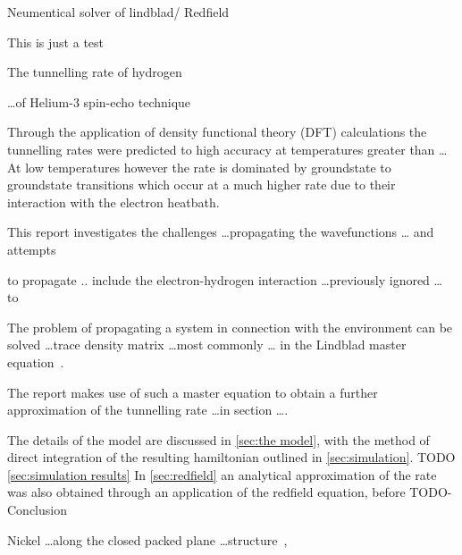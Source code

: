 
Neumentical solver of lindblad/ Redfield



This is just a test

The tunnelling rate of
hydrogen

\ldots of Helium-3 spin-echo
technique~\cite{Helium_spin_echo}

Through the application of
density functional theory (DFT)
calculations the tunnelling
rates were predicted to high
accuracy at temperatures greater
than \ldots\cite{Jianding-Zhu}
At low temperatures however
the rate is dominated
by groundstate to groundstate
transitions which occur
at a much higher rate due to
their interaction with the
electron heatbath.

This report investigates
the challenges
\ldots propagating the
wavefunctions \ldots
and attempts

to propagate
..
include the electron-hydrogen
interaction \ldots previously ignored \ldots
to

The problem of propagating
a system in connection with
the environment can
be solved \ldots trace density matrix
\ldots most commonly \ldots
in the Lindblad master
equation~\cite{Manzano_2020}.

The report makes
use of such a master equation
to obtain a further
approximation of the
tunnelling rate \ldots in section \ldots.




The details of the model
are discussed in \cref{sec:the model},
with the method of
direct integration of the
resulting hamiltonian outlined
in \cref{sec:simulation}.
TODO \cref{sec:simulation results}
In \cref{sec:redfield} an
analytical approximation
of the rate was also obtained
through an application
of the redfield equation,
before TODO-Conclusion



Nickel \ldots along the closed packed plane \ldots structure~\cite{Jianding-Zhu},